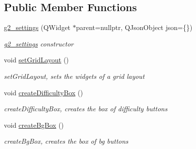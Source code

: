 \subsection*{Public Member Functions}
\begin{DoxyCompactItemize}
\item 
\hyperlink{classg2__settings_a3eb448dda234abb813d6a32bebebbcde}{g2\+\_\+settings} (Q\+Widget $\ast$parent=nullptr, Q\+Json\+Object json=\{\})
\begin{DoxyCompactList}\small\item\em \hyperlink{classg2__settings}{g2\+\_\+settings} constructor \end{DoxyCompactList}\item 
\mbox{\label{classg2__settings_a597b2a521b8f9fae3d34dff56c196a7c}} 
void \hyperlink{classg2__settings_a597b2a521b8f9fae3d34dff56c196a7c}{set\+Grid\+Layout} ()
\begin{DoxyCompactList}\small\item\em set\+Grid\+Layout, sets the widgets of a grid layout \end{DoxyCompactList}\item 
\mbox{\label{classg2__settings_a77c13b7cb2491bb0f68bb8a3ddf9de89}} 
void \hyperlink{classg2__settings_a77c13b7cb2491bb0f68bb8a3ddf9de89}{create\+Difficulty\+Box} ()
\begin{DoxyCompactList}\small\item\em create\+Difficulty\+Box, creates the box of difficulty buttons \end{DoxyCompactList}\item 
\mbox{\label{classg2__settings_a3c4aada8695c3d2b7d4869a4a5363863}} 
void \hyperlink{classg2__settings_a3c4aada8695c3d2b7d4869a4a5363863}{create\+Bg\+Box} ()
\begin{DoxyCompactList}\small\item\em create\+Bg\+Box, creates the box of bg buttons \end{DoxyCompactList}\end{DoxyCompactItemize}

